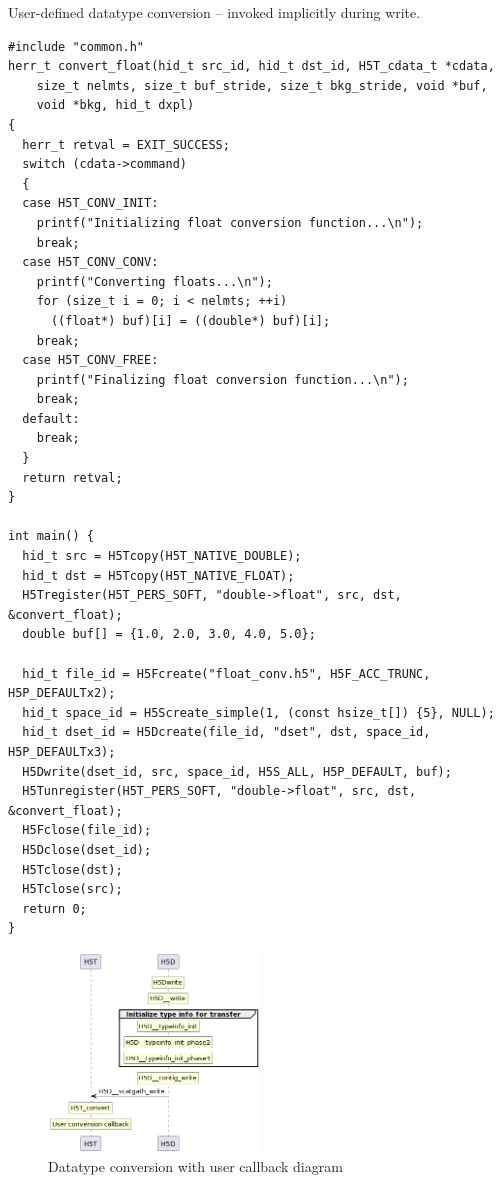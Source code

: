 \begin{listing}
\centering
\caption{User-defined datatype conversion -- invoked implicitly during write.}
\label{lst:ud-datatype-conversion-implicit}
\begin{verbatim}
#include "common.h"
herr_t convert_float(hid_t src_id, hid_t dst_id, H5T_cdata_t *cdata,
    size_t nelmts, size_t buf_stride, size_t bkg_stride, void *buf,
    void *bkg, hid_t dxpl)
{
  herr_t retval = EXIT_SUCCESS;
  switch (cdata->command)
  {
  case H5T_CONV_INIT:
    printf("Initializing float conversion function...\n");
    break;
  case H5T_CONV_CONV:
    printf("Converting floats...\n");
    for (size_t i = 0; i < nelmts; ++i)
      ((float*) buf)[i] = ((double*) buf)[i];
    break;
  case H5T_CONV_FREE:
    printf("Finalizing float conversion function...\n");
    break;
  default:
    break;
  }
  return retval;
}

int main() {
  hid_t src = H5Tcopy(H5T_NATIVE_DOUBLE);
  hid_t dst = H5Tcopy(H5T_NATIVE_FLOAT);
  H5Tregister(H5T_PERS_SOFT, "double->float", src, dst, &convert_float);
  double buf[] = {1.0, 2.0, 3.0, 4.0, 5.0};

  hid_t file_id = H5Fcreate("float_conv.h5", H5F_ACC_TRUNC, H5P_DEFAULTx2);
  hid_t space_id = H5Screate_simple(1, (const hsize_t[]) {5}, NULL);
  hid_t dset_id = H5Dcreate(file_id, "dset", dst, space_id, H5P_DEFAULTx3);
  H5Dwrite(dset_id, src, space_id, H5S_ALL, H5P_DEFAULT, buf);
  H5Tunregister(H5T_PERS_SOFT, "double->float", src, dst, &convert_float);
  H5Fclose(file_id);
  H5Dclose(dset_id);
  H5Tclose(dst);
  H5Tclose(src);
  return 0;
}
\end{verbatim}
\end{listing}

\begin{figure}
    \centering
    \includegraphics[width=0.50\textwidth]{images/tour_5_uml_datatype_conversion.png}
    \caption{Datatype conversion with user callback diagram}
    \label{fig:tour-5-uml-datatype-conversion}
\end{figure}

